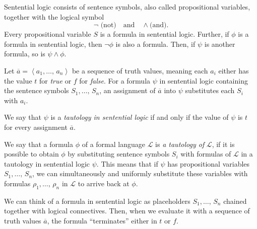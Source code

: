 \documentclass[../../main.tex]{subfiles}
\begin{document}
\begin{definition}[Tautology]\cite[pp.4-8, 24]{Cha90}
    Sentential logic consists of sentence symbols, also called propositional variables, together with the logical symbol
    $$\lnot \text{ (not)} \quad \text{and} \quad \wedge \text{(and)}.$$
    Every propositional variable $S$ is a formula in sentential logic.
    Further, if $\phi$ is a formula in sentential logic, then $\lnot \phi$ is also a formula.
    Then, if $\psi$ is another formula, so is $\psi \wedge \phi$.

    Let $\overline{a} = \left<a_1,\ldots,\, a_n\right>$ be a sequence of truth values, meaning each $a_i$ either has the value $t$ for \textit{true} or $f$ for \textit{false}.
    For a formula $\psi$ in sentential logic containing the sentence symbols $S_1,\ldots,\, S_n$, an assignment of $\overline{a}$ into $\psi$ substitutes each $S_i$ with $a_i$.

    We say that $\psi$ is a \textit{tautology in sentential logic} if and only if the value of $\psi$ is $t$ for every assignment $\overline{a}$.

    We say that a formula $\phi$ of a formal language $\mathcal{L}$ is \textit{a tautology of} $\mathcal{L}$, 
    if it is possible to obtain $\phi$ by substituting sentence symbols $S_i$ with formulas of $\mathcal{L}$ in a tautology in sentential logic $\psi$. 
    This means that if $\psi$ has propositional variables $S_1,\ldots,\, S_n$,
    we can simultaneously and uniformly substitute these variables with formulas $\rho_1,\ldots,\, \rho_n$ in $\mathcal{L}$ to arrive back at $\phi$.
\end{definition}

We can think of a formula in sentential logic as placeholders $S_1,\ldots,\, S_n$ chained together with logical connectives.
Then, when we evaluate it with a sequence of truth values $\overline{a}$, the formula ``terminates'' either in $t$ or $f$.
\end{document}
